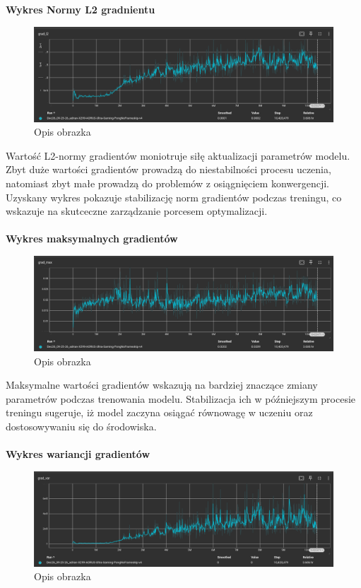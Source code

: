 \documentclass[a4paper, 12pt]{article}
\begin{document}
    \textbf{Wykres Normy L2 gradnientu}
    \begin{figure}[H]
        \centering
        \includegraphics[width=\textwidth]{pictures/A2C_grad_l2.png}
        \caption{Opis obrazka}
    \end{figure}
    Wartość L2-normy gradientów moniotruje siłę aktualizacji parametrów modelu. Zbyt duże wartości gradientów prowadzą do niestabilności procesu uczenia, 
    natomiast zbyt małe prowadzą do problemów z osiągnięciem konwergencji. Uzyskany wykres pokazuje stabilizację norm gradientów podczas treningu,
    co wskazuje na skutceczne zarządzanie porcesem optymalizacji.
    \\ \\ 
    \textbf{Wykres maksymalnych gradientów}
    \begin{figure}[H]
        \centering
        \includegraphics[width=\textwidth]{pictures/A2C_grad_max.png}
        \caption{Opis obrazka}
    \end{figure}
    Maksymalne wartości gradientów wskazują na bardziej znaczące zmiany parametrów podczas trenowania modelu.
    Stabilizacja ich w późniejszym procesie treningu sugeruje, iż model zaczyna osiągać równowagę w uczeniu oraz dostosowywaniu się do środowiska.
    \\ \\ 
    \textbf{Wykres wariancji gradientów}
    \begin{figure}[H]
        \centering
        \includegraphics[width=\textwidth]{pictures/A2C_grad_var.png}
        \caption{Opis obrazka}
    \end{figure}
\end{document}
